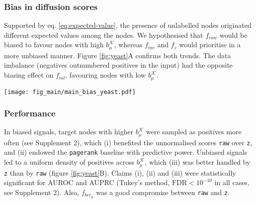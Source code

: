 \documentclass[final]{bioinfo}
\newcommand{\method}{\texttt}
\newcommand{\ebias}{b_{\mu}^{\mathcal{K}}}
\begin{document}
\subsubsection*{Bias in diffusion scores}

Supported by eq. \ref{eq:expected-value}, the presence of unlabelled nodes originated different expected values among the nodes. 
We hypothesised that $f_{raw}$ would be biased to favour nodes with high $\ebias$, whereas $f_{mc}$ and $f_z$ would prioritise in a more unbiased manner. 
Figure \ref{fig:yeast}A confirms both trends. 
The data imbalance (negatives outnumbered positives in the input) had the opposite biasing effect on $f_{ml}$, favouring nodes with low $\ebias$.

\begin{figure*}[!tpb]%
\centerline{
\texttt{[image: fig\_main/main\_bias\_yeast.pdf]}
}
\caption{Analysis of biased and unbiased synthetic signals on the yeast network. 
Nodes showed a mean value-related bias, see Supplement 2.
\textbf{(A)} Effects of the mean value bias in on the average node ranking, under biased and unbiased signals. 
Lines correspond to Generalised Additive Models with $y \sim s(x, bs = "cs")$ and 0.95 confidence intervals.
\method{raw} and \method{ml} tended to find positives with high and low $\ebias$,  respectively. 
\method{z} found positives in a more uniform manner.
\textbf{(B)} Performance in terms of AUROC and AUPRC.
The lower and the higher hinges represent the first and third quartiles, with the median indicated by the intermediate bar. 
The whiskers extend up to 1.5 times the interquantile range from the box; more distant data points are displayed as outliers.
\method{raw} was better suited for biased signals, for which the \method{pagerank} baseline also outperformed a random predictor. 
Conversely, \method{z} worked best on unbiased signals. 
}
\label{fig:yeast}
\end{figure*}

\subsubsection*{Performance}

In biased signals, target nodes with higher $\ebias$ were sampled as positives more often (see Supplement 2), which (i) benefited the unnormalised scores \method{raw} over \method{z}, and (ii) endowed the \method{pagerank} baseline with predictive power.
Unbiased signals led to a uniform density of positives across $\ebias$, which (iii) was better handled by \method{z} than by \method{raw} (figure \ref{fig:yeast}B). 
Claims (i), (ii) and (iii) were statistically significant for AUROC and AUPRC (Tukey's method, $\textrm{FDR}<10^{-10}$ in all cases, see Supplement 2).
Also, $f_{ber_p}$ was a good compromise between \method{raw} and \method{z}.
\end{document}

